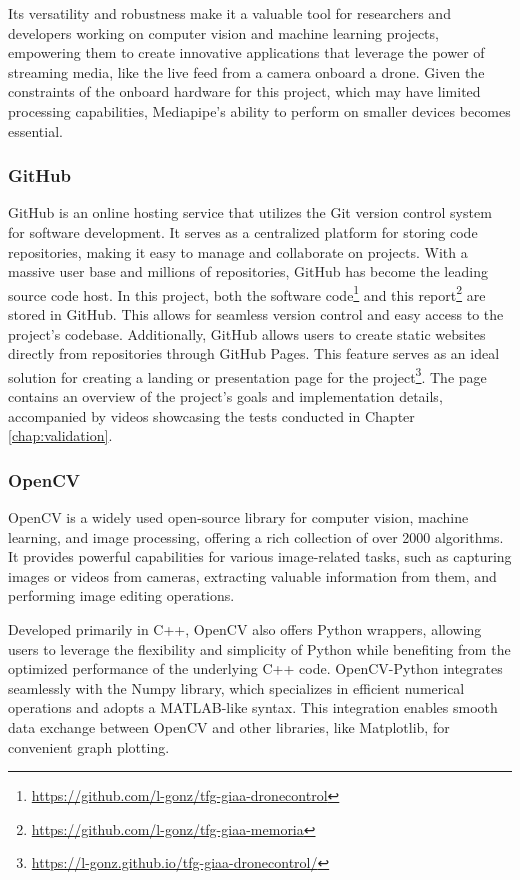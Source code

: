 Its versatility and robustness make it a valuable tool for researchers and developers working on computer vision and machine learning projects, empowering them to create innovative applications that leverage the power of streaming media, like the live feed from a camera onboard a drone.
Given the constraints of the onboard hardware for this project, which may have limited processing capabilities, Mediapipe's ability to perform on smaller devices becomes essential. 


\subsubsection{GitHub}
\label{subsec:github}

GitHub is an online hosting service that utilizes the Git version control system for software development. It serves as a centralized platform for storing code repositories, making it easy to manage and collaborate on projects. With a massive user base and millions of repositories, GitHub has become the leading source code host. 
In this project, both the software code\footnote{\url{https://github.com/l-gonz/tfg-giaa-dronecontrol}} and this report\footnote{\url{https://github.com/l-gonz/tfg-giaa-memoria}} are stored in GitHub. This allows for seamless version control and easy access to the project's codebase. 
Additionally, GitHub allows users to create static websites directly from repositories through GitHub Pages. This feature  serves as an ideal solution for creating a landing or presentation page for the project\footnote{\url{https://l-gonz.github.io/tfg-giaa-dronecontrol/}}. The page contains an overview of the project's goals and implementation details, accompanied by videos showcasing the tests conducted in Chapter \ref{chap:validation}.


\subsubsection{OpenCV}
\label{subsec:opencv}

OpenCV is a widely used open-source library for computer vision, machine learning, and image processing, offering a rich collection of over 2000 algorithms. It provides powerful capabilities for various image-related tasks, such as capturing images or videos from cameras, extracting valuable information from them, and performing image editing operations.

Developed primarily in C++, OpenCV also offers Python wrappers, allowing users to leverage the flexibility and simplicity of Python while benefiting from the optimized performance of the underlying C++ code. OpenCV-Python integrates seamlessly with the Numpy library, which specializes in efficient numerical operations and adopts a MATLAB-like syntax. This integration enables smooth data exchange between OpenCV and other libraries, like Matplotlib, for convenient graph plotting.

